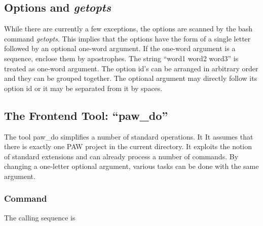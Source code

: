 \documentclass[final,12pt]{article}
\begin{document}
{{{{{{%
\subsection{Options and \textit{getopts}}
While there are currently a few exceptions, the options are scanned by
the bash command \textit{getopts}. This implies that the options have
the form of a single letter followed by an optional one-word
argument. If the one-word argument is a sequence, enclose them by
apostrophes. The string ``word1 word2 word3'' is treated as one-word
argument.  The option id's can be arranged in arbitrary order and they
can be grouped together. The optional argument may directly follow its
option id or it may be separated from it by spaces.

\subsection{The Frontend Tool: ``paw\_do''}
\label{sec:pawshow}
The tool paw\_do simplifies a number of standard operations.  It It
assumes that there is exactly one PAW project in the current
directory.  It exploits the notion of standard extensions and can
already process a number of commands. By changing a one-letter
optional argument, various tasks can be done with the same argument.


\subsubsection{Command}

The calling sequence is

\bigskip{}\bigskip

}}}}}}
\end{document}
